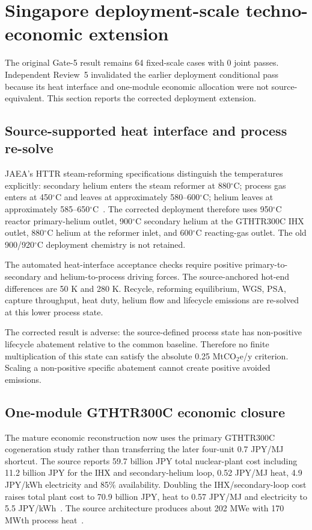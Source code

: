 \section{Singapore deployment-scale techno-economic extension}
\label{sec:deployment-extension}
The original Gate-5 result remains 64 fixed-scale cases with 0 joint passes. Independent Review~5 invalidated the earlier deployment conditional pass because its heat interface and one-module economic allocation were not source-equivalent. This section reports the corrected deployment extension.

\subsection{Source-supported heat interface and process re-solve}
JAEA's HTTR steam-reforming specifications distinguish the temperatures explicitly: secondary helium enters the steam reformer at 880$^\circ$C; process gas enters at 450$^\circ$C and leaves at approximately 580--600$^\circ$C; helium leaves at approximately 585--650$^\circ$C~\cite{jaea2018excellent,jaea2007mockup}. The corrected deployment therefore uses 950$^\circ$C reactor primary-helium outlet, 900$^\circ$C secondary helium at the GTHTR300C IHX outlet, 880$^\circ$C helium at the reformer inlet, and 600$^\circ$C reacting-gas outlet. The old 900/920$^\circ$C deployment chemistry is not retained.

The automated heat-interface acceptance checks require positive primary-to-secondary and helium-to-process driving forces. The source-anchored hot-end differences are 50 K and 280 K. Recycle, reforming equilibrium, WGS, PSA, capture throughput, heat duty, helium flow and lifecycle emissions are re-solved at this lower process state.

The corrected result is adverse: the source-defined process state has non-positive lifecycle abatement relative to the common baseline. Therefore no finite multiplication of this state can satisfy the absolute 0.25 MtCO$_2$e/y criterion. Scaling a non-positive specific abatement cannot create positive avoided emissions.

\subsection{One-module GTHTR300C economic closure}
The mature economic reconstruction now uses the primary GTHTR300C cogeneration study rather than transferring the later four-unit 0.7 JPY/MJ shortcut. The source reports 59.7 billion JPY total nuclear-plant cost including 11.2 billion JPY for the IHX and secondary-helium loop, 0.52 JPY/MJ heat, 4.9 JPY/kWh electricity and 85\% availability. Doubling the IHX/secondary-loop cost raises total plant cost to 70.9 billion JPY, heat to 0.57 JPY/MJ and electricity to 5.5 JPY/kWh~\cite{nishihara2007potential}. The source architecture produces about 202 MWe with 170 MWth process heat~\cite{jaeri2004gthtr300c}.


